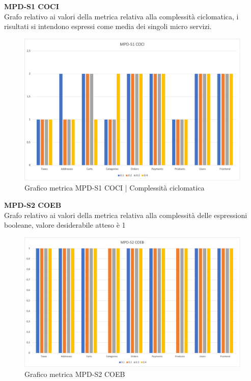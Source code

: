 \begin{center}
    \textbf{MPD-S1 COCI} \\
    Grafo relativo ai valori della metrica relativa alla complessità ciclomatica, i risultati si intendono espressi come media dei singoli
    micro servizi.
    \begin{figure}[!htb]
        \centering
        \includegraphics[scale=0.50]{res/images/ra/ra_coci.png}
        \caption{Grafico metrica MPD-S1 COCI | Complessità ciclomatica}
    \end{figure}
    \begin{center}
        
    \end{center}
\end{center}

\newpage

\begin{center}
    \textbf{MPD-S2 COEB} \\
    Grafo relativo ai valori della metrica relativa alla complessità delle espressioni booleane, valore desiderabile atteso è 1
    \begin{figure}[!htb]
        \centering
        \includegraphics[scale=0.50]{res/images/ra/ra_coeb.png}
        \caption{Grafico metrica MPD-S2 COEB}
    \end{figure}
    \begin{center}
    \end{center}
\end{center}

